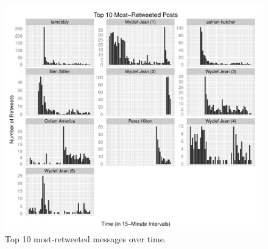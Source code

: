 \documentclass[a4paper, 11pt, titlepage]{article}
\begin{document}
\begin{figure}[h]
  \centering
\includegraphics[width=120mm]{../figures/rt_top_10_over_time_free_scale}
\caption{Top 10 most-retweeted messages over time.}
\label{fig:rt_top_10}
\end{figure}
\end{document}

